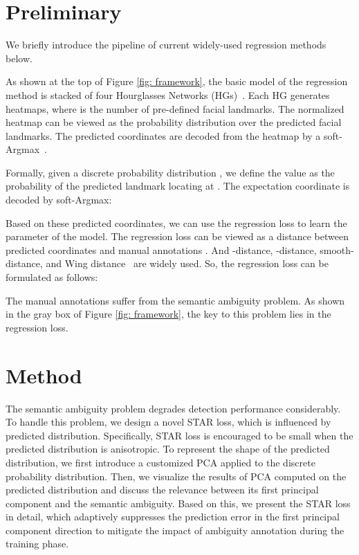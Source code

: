 \documentclass[10pt,twocolumn,letterpaper]{article}
\begin{document}
\section{Preliminary}
We briefly introduce the pipeline of current widely-used regression methods below.

As shown at the top of Figure \ref{fig: framework}, the basic model of the regression method is stacked of four  Hourglasses Networks (HGs)~\cite{zhang2014facial}.
Each HG generates  heatmaps, where  is the number of pre-defined facial landmarks.
The normalized heatmap can be viewed as the probability distribution over the predicted facial landmarks.
The predicted coordinates are decoded from the heatmap by a soft-Argmax~\cite{nibali2018numerical}.
 
Formally, given a discrete probability distribution , we define the value  as the probability of the predicted landmark locating at . 
The expectation coordinate  is decoded by soft-Argmax:


Based on these predicted coordinates, we can use the regression loss to learn the parameter of the model.
The regression loss can be viewed as a distance   between predicted coordinates  and manual annotations . And -distance, -distance, smooth- distance, and Wing distance~\cite{feng2018wing} are widely used.
So, the regression loss can be formulated as follows:


The manual annotations suffer from the semantic ambiguity problem. 
As shown in the gray box of Figure \ref{fig: framework}, the key to this problem lies in the regression loss.

\section{Method}

The semantic ambiguity problem degrades detection performance considerably.
To handle this problem, we design a novel STAR loss, which is influenced by predicted distribution.
Specifically, STAR loss is encouraged to be small when the predicted distribution is anisotropic.
To represent the shape of the predicted distribution, we first introduce a customized PCA applied to the discrete probability distribution.
Then, we visualize the results of PCA computed on the predicted distribution and discuss the relevance between its first principal component and the semantic ambiguity.
Based on this, we present the STAR loss in detail, which adaptively suppresses the prediction error in the first principal component direction to mitigate the impact of ambiguity annotation during the training phase. 
\end{document}
